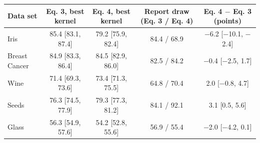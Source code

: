 \begin{tabular}{@{}lcccc@{}}
\toprule
Data set & Eq. 3, best kernel & Eq. 4, best kernel & Report draw (Eq. 3 / Eq. 4) & Eq. 4 $-$ Eq. 3 (points) \\
\midrule
Iris & 85.4 [83.1, 87.4] & 79.2 [75.9, 82.4] & 84.4 / 68.9 & $-$6.2 [$-$10.1, $-$2.4] \\
Breast Cancer & 84.9 [83.3, 86.4] & 84.5 [82.9, 86.0] & 82.5 / 84.2 & $-$0.4 [$-$2.5, 1.7] \\
Wine & 71.4 [69.3, 73.6] & 73.4 [71.3, 75.5] & 64.8 / 70.4 & 2.0 [$-$0.8, 4.7] \\
Seeds & 76.3 [74.5, 77.9] & 79.3 [77.3, 81.2] & 84.1 / 92.1 & 3.1 [0.5, 5.6] \\
Glass & 56.3 [54.9, 57.6] & 54.2 [52.8, 55.6] & 56.9 / 55.4 & $-$2.0 [$-$4.2, 0.1] \\
\bottomrule
\end{tabular}
